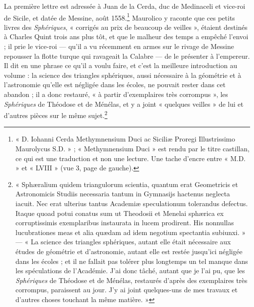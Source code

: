 \documentclass[11pt,a4paper]{article}
\begin{document}
La première lettre est adressée à Juan de la Cerda, duc de Medinaceli et
vice-roi de Sicile, et datée de Messine, août 1558.\footnote{« D. Iohanni Cerda
Methymnensium Duci ac Siciliæ Proregi Illustrissimo Maurolycus S.D. » ;
« Methymnensium Duci » est rendu par le titre castillan, ce qui est une
traduction et non une lecture. Une tache d'encre entre « M.D. » et « LVIII »
(vue 3, page de gauche).} Maurolico y raconte que ces petits livres des
\emph{Sphériques}, « corrigés au prix de beaucoup de veilles », étaient destinés
à Charles Quint trois ans plus tôt, et que le malheur des temps a empêché
l'envoi ; il prie le vice-roi — qu'il a vu récemment en armes sur le rivage
de Messine repousser la flotte turque qui ravageait la Calabre — de le
présenter à l'empereur. Il dit en une phrase ce qu'il a voulu faire, et c'est
la meilleure introduction au volume : la science des triangles sphériques,
aussi nécessaire à la géométrie et à l'astronomie qu'elle est négligée dans les
écoles, ne pouvait rester dans cet abandon ; il a donc restauré, « à partir
d'exemplaires très corrompus », les \emph{Sphériques} de Théodose et de
Ménélas, et y a joint « quelques veilles » de lui et d'autres pièces sur le
même sujet.\footnote{« Sphæralium quidem triangulorum scientia, quantum erat
Geometricis et Astronomicis Studiis necessaria tantum in Gymnasijs hactenus
neglecta iacuit. Nec erat ulterius tantus Academiæ speculationum tolerandus
defectus. Itaque quoad potui conatus sum ut Theodosii et Menelai sphærica ex
corruptissimis exemplaribus instaurata in lucem prodirent. His nonnullas
lucubrationes meas et alia quædam ad idem negotium spectantia subiunxi. » —
« La science des triangles sphériques, autant elle était nécessaire aux études
de géométrie et d'astronomie, autant elle est restée jusqu'ici négligée dans
les écoles ; et il ne fallait pas tolérer plus longtemps un tel manque dans les
spéculations de l'Académie. J'ai donc tâché, autant que je l'ai pu, que les
\emph{Sphériques} de Théodose et de Ménélas, restaurés d'après des exemplaires
très corrompus, paraissent au jour. J'y ai joint quelques-uns de mes travaux et
d'autres choses touchant la même matière. »}
\end{document}
